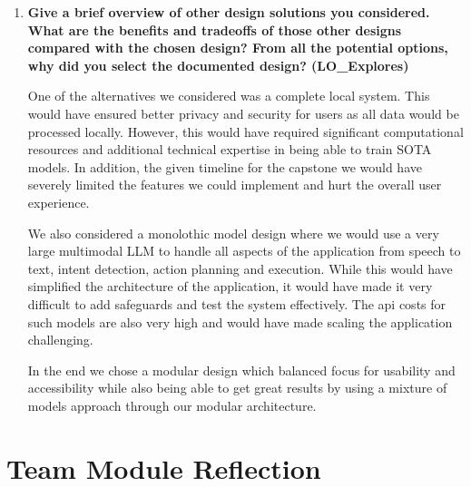 \documentclass[12pt, titlepage]{article}
\begin{document}
\begin{enumerate}
\item \textbf{Give a brief overview of other design solutions you
considered. What are the benefits and tradeoffs of those other
designs compared with the chosen design? From all the potential
options, why did you select the documented design? (LO\_Explores)}

One of the alternatives we considered was a complete local system. This would
have ensured better privacy and security for users as all data would be
processed locally. However, this would have required significant computational
resources and additional technical expertise in being able to train SOTA models.
In addition, the given timeline for the capstone we would have severely limited
the features we could implement and hurt the overall user experience.

We also considered a monolothic model design where we would use a very large
multimodal LLM to handle all aspects of the application from speech to text,
intent detection, action planning and execution. While this would have
simplified the architecture of the application, it would have made it very
difficult to add safeguards and test the system effectively. The api costs for
such models are also very high and would have made scaling the application
challenging.

In the end we chose a modular design which balanced focus for usability and
accessibility while also being able to get great results by using a mixture of
models approach through our modular architecture.
\end{enumerate}

\section*{Team Module Reflection}
\end{document}
